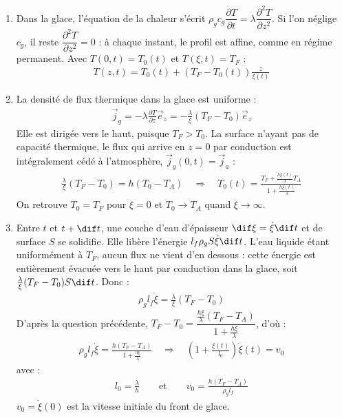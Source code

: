 \begin{correction}

\begin{enumerate}

	\item Dans la glace, l'équation de la chaleur s'écrit $\rho_gc_g\dfrac{\partial T}{\partial t}=\lambda\dfrac{\partial^2 T}{\partial z^2}$. Si l'on néglige $c_g$, il reste $\dfrac{\partial^2 T}{\partial z^2}=0$ : à chaque instant, le profil est affine, comme en régime permanent. Avec $T(0,t)=T_0(t)$ et $T(\xi,t)=T_F$ :
	\begin{align*}
		\boxed{T(z,t)=T_0(t)+\left(T_F-T_0(t)\right)\frac{z}{\xi(t)}}
	\end{align*}

	\item La densité de flux thermique dans la glace est uniforme :
	\begin{align*}
		\vec{j}_g=-\lambda\frac{\partial T}{\partial z}\vec{e}_z=-\frac{\lambda}{\xi}\left(T_F-T_0\right)\vec{e}_z
	\end{align*}
	Elle est dirigée vers le haut, puisque $T_F>T_0$. La surface n'ayant pas de capacité thermique, le flux qui arrive en $z=0$ par conduction est intégralement cédé à l'atmosphère, $\vec{j}_g(0,t)=\vec{j}_a$ :
	\begin{align*}
		\frac{\lambda}{\xi}\left(T_F-T_0\right)=h\left(T_0-T_A\right) \quad\Rightarrow\quad \boxed{T_0(t)=\frac{T_F+\frac{h\xi(t)}{\lambda}T_A}{1+\frac{h\xi(t)}{\lambda}}}
	\end{align*}
	On retrouve $T_0=T_F$ pour $\xi=0$ et $T_0\to T_A$ quand $\xi\to\infty$.

	\item Entre $t$ et $t+\dif t$, une couche d'eau d'épaisseur $\dif\xi=\dot{\xi}\dif t$ et de surface $S$ se solidifie. Elle libère l'énergie $l_f\rho_gS\dot{\xi}\dif t$. L'eau liquide étant uniformément à $T_F$, aucun flux ne vient d'en dessous : cette énergie est entièrement évacuée vers le haut par conduction dans la glace, soit $\frac{\lambda}{\xi}(T_F-T_0)S\dif t$. Donc :
	\begin{align*}
		\rho_gl_f\dot{\xi}=\frac{\lambda}{\xi}\left(T_F-T_0\right)
	\end{align*}
	D'après la question précédente, $T_F-T_0=\dfrac{\frac{h\xi}{\lambda}(T_F-T_A)}{1+\frac{h\xi}{\lambda}}$, d'où :
	\begin{align*}
		\rho_gl_f\dot{\xi}=\frac{h(T_F-T_A)}{1+\frac{h\xi}{\lambda}} \quad\Rightarrow\quad \boxed{\left( 1+\frac{\xi(t)}{l_0}\right) \dot{\xi}(t)=v_0}
	\end{align*}
	avec :
	\begin{align*}
		\boxed{l_0=\frac{\lambda}{h}} \qquad\text{et}\qquad \boxed{v_0=\frac{h(T_F-T_A)}{\rho_gl_f}}
	\end{align*}
	$v_0=\dot{\xi}(0)$ est la vitesse initiale du front de glace.


\end{enumerate}
\end{correction}

